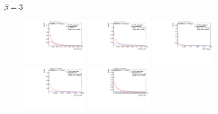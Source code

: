 \subsubsection*{$\beta=3$}
\begin{figure}[H]
\includegraphics[width=0.3\textwidth]{sascha_input/Appendix/Distributions/w/distributions/beta3/h_assisted_tj_C2_3_bin1.pdf} \hspace{1mm}
\includegraphics[width=0.3\textwidth]{sascha_input/Appendix/Distributions/w/distributions/beta3/h_assisted_tj_C2_3_bin2.pdf} \hspace{1mm}
\includegraphics[width=0.3\textwidth]{sascha_input/Appendix/Distributions/w/distributions/beta3/h_assisted_tj_C2_3_bin3.pdf} 
\bigskip
\includegraphics[width=0.3\textwidth]{sascha_input/Appendix/Distributions/w/distributions/beta3/h_assisted_tj_C2_3_bin4.pdf} \hspace{1mm}
\includegraphics[width=0.3\textwidth]{sascha_input/Appendix/Distributions/w/distributions/beta3/h_assisted_tj_C2_3_bin5.pdf} \hspace{1mm}

\end{figure}
